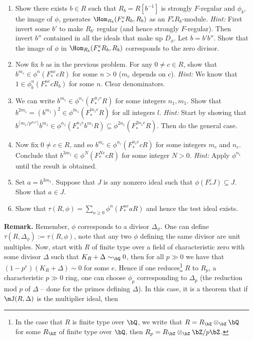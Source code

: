 \documentclass[12pt]{amsart}
\numberwithin{equation}{theorem}
\renewcommand{\:}{\colon}
\theoremstyle{theorem}
\begin{document}
\begin{enumerate}[label=(\arabic*)]
\begin{enumerate}
        \emph{Hint:} We know there exists a $d > 0$ and $\psi \in \Hom_R(F^d_* R, R)$ such that $\psi(F^e_* c) = 1$.  Show that you can choose $d$ such that $e$ divides $d$. In this case, $\psi$ is a pre-multiple of some $\phi^n$.
    \item Show there exists $b \in R$ such that $R_b = R[b^{-1}]$ is strongly $F$-regular and $\phi_b$, the image of $\phi$, generates $\Hom_{R_b}(F^e_* R_b, R_b)$ as an $F^e_* R_b$-module.
        \vskip 3pt
        \emph{Hint:} First invert some $b'$ to make $R_{b'}$ regular (and hence strongly $F$-regular).  Then invert $b''$ contained in all the ideals that make up $D_{\phi}$.  Let $b = b'b''$.  Show that the image of $\phi$ in $\Hom_{R_{b}}(F^e_* R_b, R_b)$ corresponds to the zero divisor.
    \item Now fix $b$ as in the previous problem.  For any $0 \neq c \in R$, show that $b^{m_c} \in \phi^n(F^{ne}_* cR)$ for some $n > 0$ ($m_c$ depends on $c$).
        \vskip 3pt
        \emph{Hint:} We know that $1 \in \phi^n_b(F^{ne}_* cR_b)$ for some $n$.  Clear denominators.
    \item We can write $b^{m_1} \in \phi^{n_1}(F^{n_1 e}_* R)$ for some integers $n_1, m_1$.  Show that $b^{2 m_1} = (b^{m_1})^2 \in \phi^{l n_1}(F^{ln_1e}_* R)$ for all integers $l$.
        \vskip 3pt
        \emph{Hint:} Start by showing that $b^{\lceil m_1/p^{n_1 e} \rceil} b^{m_1} \in \phi^{n_1}(F^{n_1e}_* b^{m_1}R) \subseteq \phi^{2n_1}(F^{2n_1e}_* R)$.  Then do the general case.
    \item Now fix $0 \neq c \in R$, and so $b^{m_c} \in \phi^{n_c}(F^{n_c e}_* c R)$ for some integers $m_c$ and $n_c$.  Conclude that $b^{3 m_1} \in \phi^N(F^{Ne}_* cR)$ for some integer $N > 0$.
        \vskip 3pt
        \emph{Hint:}  Apply $\phi^{n_1}$ until the result is obtained.
    \item Set $a = b^{3m_1}$.  Suppose that $J$ is any nonzero ideal such that $\phi(F^e_* J) \subseteq J$.  Show that $a \in J$.
    \item Show that $\tau(R, \phi) = \sum_{n \geq 0} \phi^n(F^{ne}_* aR)$ and hence the test ideal exists.
    \end{enumerate}
    \vskip 24pt
    \noindent
    {\bf Remark.}  Remember, $\phi$ corresponds to a divisor $\Delta_{\phi}$.  One can define $\tau(R, \Delta_{\phi}) := \tau(R, \phi)$, note that any two $\phi$ defining the same divisor are unit multiples.  Now, start with $R$ of finite type over a field of characteristic zero with some divisor $\Delta$ such that $K_R + \Delta \sim_{\bQ} 0$, then for all $p \gg 0$ we have that $(1-p^e)(K_R + \Delta) \sim 0$ for some $e$.  Hence if one reduces\footnote{In the case that $R$ is finite type over $\bQ$, we write that $R = R_{\bZ} \otimes_{\bZ} \bQ$ for some $R_{\bZ}$ of finite type over $\bQ$, then $R_p = R_{\bZ} \otimes_{\bZ} {\bZ/p\bZ}$.} $R$ to $R_p$, a characteristic $p \gg 0$ ring, one can choose $\phi_p$ corresponding to $\Delta_p$ (the reduction mod $p$ of $\Delta$ -- done for the primes defining $\Delta$).  In this case, it is a theorem that if $\mJ(R, \Delta)$ is the multiplier ideal, then

\end{enumerate}
\end{document}
